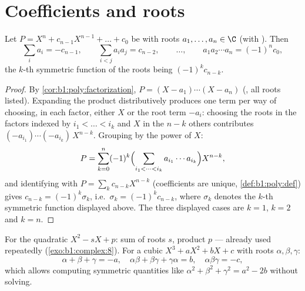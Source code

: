 \section{Coefficients and roots}

\begin{theorem}\label{thm:b1:poly:vieta}
Let $P = X^n + c_{n-1} X^{n-1} + \dots + c_0$ be  with roots
$a_1, \dots, a_n \in \C$ (with ). Then
\[
\sum_i a_i = -c_{n-1},
\qquad
\sum_{i < j} a_i a_j = c_{n-2},
\qquad \dots, \qquad
a_1 a_2 \cdots a_n = (-1)^n c_0 ,
\]
the $k$-th symmetric function of the roots being $(-1)^k c_{n-k}$.
\end{theorem}

\begin{proof}
By \cref{cor:b1:poly:factorization}, $P = (X - a_1)\cdots(X -
a_n)$ (, all roots listed). Expanding the product
distributively produces one term per way of choosing, in each
factor, either $X$ or the root term $-a_i$: choosing the roots in
the factors indexed by $i_1 < \dots < i_k$ and $X$ in the $n - k$
others contributes $(-a_{i_1})\cdots(-a_{i_k})\,X^{n-k}$. Grouping
by the power of $X$:
\[
P = \sum_{k=0}^{n} (-1)^k
\Bigl(\sum_{i_1 < \dots < i_k} a_{i_1}\cdots a_{i_k}\Bigr)
X^{n-k} ,
\]
and identifying with $P = \sum_k c_{n-k}X^{n-k}$ (coefficients
are unique, \cref{def:b1:poly:def}) gives $c_{n-k} = (-1)^k
\sigma_k$, i.e.\ $\sigma_k = (-1)^kc_{n-k}$, where $\sigma_k$
denotes the $k$-th symmetric function displayed above. The three
displayed cases are $k = 1$, $k = 2$ and $k = n$.
\end{proof}

\begin{example}\label{ex:b1:poly:vieta}
For the quadratic $X^2 - sX + p$: sum of roots $s$, product $p$ ---
already used repeatedly (\cref{exo:b1:complex:8}). For a  cubic
$X^3 + aX^2 + bX + c$ with roots $\alpha, \beta, \gamma$:
\[
\alpha + \beta + \gamma = -a,
\quad
\alpha\beta + \beta\gamma + \gamma\alpha = b,
\quad
\alpha\beta\gamma = -c ,
\]
which allows computing symmetric quantities like $\alpha^2 + \beta^2
+ \gamma^2 = a^2 - 2b$ without solving.
\end{example}

